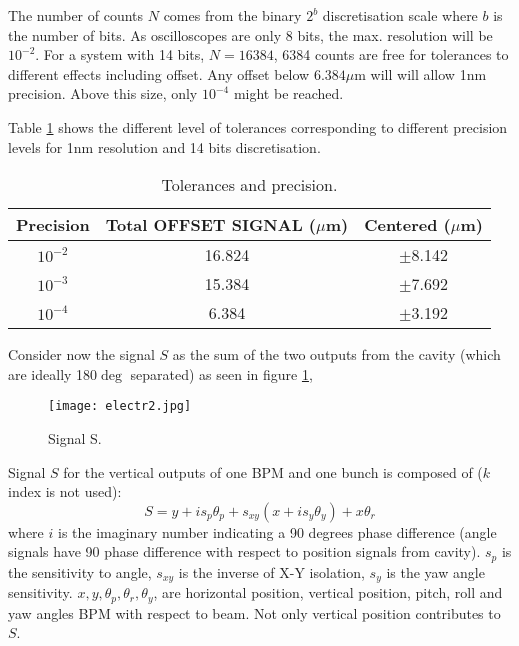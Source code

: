 The number of counts $N$ comes from the binary $2^b$ discretisation scale where $b$ is the number of bits. As oscilloscopes are only 8 bits, the max. resolution will be $10^{-2}$. For a system with 14 bits, $N=16384$,  6384 counts are free for tolerances to different effects including offset. Any offset below $6.384\mu$m will will allow 1nm precision. Above this size, only $10^{-4}$ might be reached.\par
Table \ref{toletab} shows the different level of tolerances corresponding to different precision levels for 1nm resolution and 14 bits discretisation.\par
\begin{table}[hbt]
\begin{center}
 \begin{tabular}{|c|c|c|}\hline
 Precision & Total OFFSET SIGNAL ($\mu$m) & Centered ($\mu$m)\\\hline
 $10^{-2}$ &16.824&$\pm$8.142 \\\hline
 $10^{-3}$ &15.384&$\pm$7.692\\\hline
 $10^{-4}$ &6.384&$\pm$3.192\\\hline
 \end{tabular}
 \caption{Tolerances and precision.}\label{toletab}
 \end{center}
\end{table}
Consider now the signal $S$ as the sum of the two outputs from the cavity (which are ideally 180$\deg$ separated) as seen in figure \ref{Ssignal},\par
\begin{figure}[htb]
 \begin{center}
  \texttt{[image: electr2.jpg]}\caption{Signal S.}\label{Ssignal}
 \end{center}
\end{figure}
Signal $S$ for the vertical outputs of one BPM and one bunch is composed of ($k$ index is not used):
\begin{equation}
S = y+is_p\theta_p+s_{xy}(x+is_y\theta_y)+x\theta_r
\end{equation}
where $i$ is the imaginary number indicating a 90 degrees phase difference (angle signals have 90 phase difference with respect to position signals from cavity). $s_p$ is the sensitivity to angle, $s_{xy}$ is the inverse of X-Y isolation, $s_y$ is the yaw angle sensitivity. $x,y,\theta_p,\theta_r,\theta_y$, are horizontal position, vertical position, pitch, roll and yaw angles BPM with respect to beam. Not only vertical position contributes to $S$.\par
